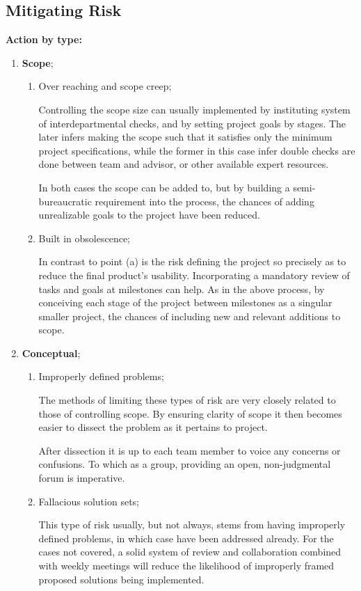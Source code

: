  \subsection{Mitigating Risk}
  \hspace{.35cm} \textbf{Action by type:}
  \begin{enumerate}
  \item \textbf{Scope}; 
  \begin{enumerate}
  \item Over reaching and scope creep; 
  
  Controlling the scope size can usually implemented by instituting system of interdepartmental checks, and by setting project goals by stages. The later infers making the scope such that it satisfies only the minimum project specifications, while the former in this case infer double checks are done between team and advisor, or other available expert resources.
  
  In both cases the scope can be added to, but by building a semi-bureaucratic requirement into the process, the chances of adding unrealizable goals to the project have been reduced.
  \item Built in obsolescence;
  
  In contrast to point (a) is the risk defining the project so precisely as to reduce the final product's usability. Incorporating a mandatory review of tasks and goals at milestones can help. As in the above process, by conceiving each stage of the  project between milestones as a singular smaller project, the chances of including new and relevant additions to scope.
   \end{enumerate}
  \item \textbf{Conceptual};
  \begin{enumerate}
  \item Improperly defined problems; 
  
  The methods of limiting these types of risk are very closely related to those of controlling scope. By ensuring clarity of scope it then becomes easier to dissect the problem as it pertains to project.
  
  After dissection it is up to each team member to voice any concerns or confusions. To which as a group, providing an open, non-judgmental forum is imperative.
  \item Fallacious solution sets; 
  
  This type of risk usually, but not always, stems from having improperly defined problems, in which case have been addressed already. For the cases not covered, a solid system of review and collaboration combined with weekly meetings will reduce the likelihood of improperly framed proposed solutions being implemented.
  

\end{enumerate}
\end{enumerate}
